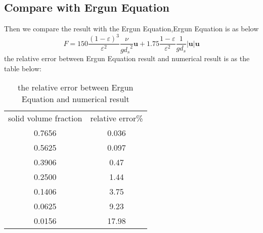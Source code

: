 \documentclass{article}
\begin{document}
\subsection{\label{sec:level1}Compare with Ergun Equation}
Then we compare the result with the Ergun Equation,Ergun Equation is as below
         \begin{equation}
F=150\frac{(1-\varepsilon)^3}{\varepsilon^2}\frac{\nu}{g {d_s}^2}\bm u+1.75\frac{1-\varepsilon}{\varepsilon^2}\frac{1}{gd_s}|\bm u|\bm u
         \end{equation}
the relative error between Ergun Equation result and numerical result is as the table below:
\begin{table}[!h]
\centering
\caption{the relative error between Ergun Equation and numerical result}

\begin{tabular}{cc}
\hline
solid volume fraction& relative error\%   \\
0.7656      & 0.036    \\
0.5625      & 0.097   \\
0.3906      & 0.47    \\
0.2500      & 1.44   \\
0.1406      & 3.75   \\
0.0625      & 9.23 \\
0.0156      & 17.98 \\
\hline
\end{tabular}

\end{table}
\end{document}
